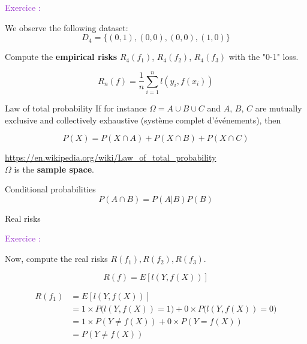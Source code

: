 \documentclass[usenames,dvipsnames]{beamer}
\newcounter{numexos}%
\newcommand{\exercice}[1]{%
\addtocounter{numexos}{1}%
\textcolor{DarkOrchid}{Exercice\,\thenumexos\,:}\,#1%
}
\begin{document}
\begin{frame}{}
    \exercice{}

    We observe the following dataset:
    \begin{equation*}
        D_4 = \{(0, 1), (0, 0), (0, 0), (1, 0)\}
    \end{equation*}

    Compute the \textbf{empirical risks} $R_4(f_1)$, $R_4(f_2)$, $R_4(f_3)$ with the "0-1" loss.

    \begin{equation*}
	R_n(f) = \frac{1}{n} \sum^{n}_{i=1} l(y_i, f(x_i))
    \end{equation*}
    
\end{frame}

\begin{frame}{Law of total probability}
    If for instance $ \Omega = A\cup B\cup C$ and $A$, $B$, $C$ are mutually
    exclusive and collectively exhaustive (système complet d'événements), then

    \begin{equation}
        P(X) = P(X\cap A)+P(X\cap B)+P(X\cap C)
    \end{equation}

\url{https://en.wikipedia.org/wiki/Law_of_total_probability} 
\\

$\Omega$ is the \textbf{sample space}.
\end{frame}

\begin{frame}{Conditional probabilities}
    \begin{equation}
        P(A\cap B) = P(A|B)P(B)
    \end{equation}
\end{frame}


\begin{frame}{Real risks}
    \exercice{}
    Now, compute the real risks $R(f_1), R(f_2), R(f_3)$.

    \begin{equation}
           R(f)= E[l(Y, f(X))]
    \end{equation}
\end{frame}

\begin{frame}{}
    \begin{equation}
        \begin{aligned}
            \label{eq:}
            R(f_1)&= E[l(Y, f(X))] \\
	    &= 1\times P\Big(l(Y, f(X))=1\Big)+ 0\times P\Big(l(Y, f(X))=0\Big)\\
            &= 1\times P(Y\neq f(X))+ 0\times P(Y=f(X))\\
            &= P(Y\neq f(X))
        \end{aligned}
    \end{equation}
\end{frame}
\end{document}
